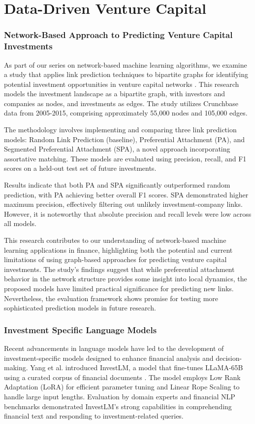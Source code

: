 \documentclass[a4paper, oneside]{discothesis}
\begin{document}
\section{Data-Driven Venture Capital}

\subsubsection{Network-Based Approach to Predicting Venture Capital Investments}

As part of our series on network-based machine learning algorithms, we examine a study that applies link prediction techniques to bipartite graphs for identifying potential investment opportunities in venture capital networks \cite{predictVCbipartite}. This research models the investment landscape as a bipartite graph, with investors and companies as nodes, and investments as edges. The study utilizes Crunchbase data from 2005-2015, comprising approximately 55,000 nodes and 105,000 edges.

The methodology involves implementing and comparing three link prediction models: Random Link Prediction (baseline), Preferential Attachment (PA), and Segmented Preferential Attachment (SPA), a novel approach incorporating assortative matching. These models are evaluated using precision, recall, and F1 scores on a held-out test set of future investments.

Results indicate that both PA and SPA significantly outperformed random prediction, with PA achieving better overall F1 scores. SPA demonstrated higher maximum precision, effectively filtering out unlikely investment-company links. However, it is noteworthy that absolute precision and recall levels were low across all models.


This research contributes to our understanding of network-based machine learning applications in finance, highlighting both the potential and current limitations of using graph-based approaches for predicting venture capital investments. The study's findings suggest that while preferential attachment behavior in the network structure provides some insight into local dynamics, the proposed models have limited practical significance for predicting new links. Nevertheless, the evaluation framework shows promise for testing more sophisticated prediction models in future research.

\subsubsection{Investment Specific Language Models}
Recent advancements in language models have led to the development of investment-specific models designed to enhance financial analysis and decision-making. Yang et al. introduced InvestLM, a model that fine-tunes LLaMA-65B using a curated corpus of financial documents \cite{yang2023investlm}. The model employs Low Rank Adaptation (LoRA) for efficient parameter tuning and Linear Rope Scaling to handle large input lengths. Evaluation by domain experts and financial NLP benchmarks demonstrated InvestLM's strong capabilities in comprehending financial text and responding to investment-related queries.
\end{document}
